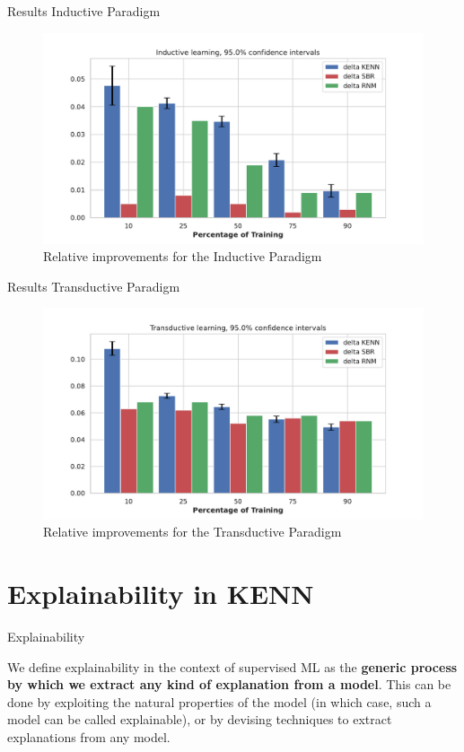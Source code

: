 \documentclass{beamer}
\begin{document}
\begin{frame}{Results Inductive Paradigm}
	\begin{figure}
		\centering
		\includegraphics[width=\linewidth]{images/deltas_inductive.pdf}
		\caption{Relative improvements for the Inductive Paradigm}
	\end{figure}
\end{frame}

\begin{frame}{Results Transductive Paradigm}
	\begin{figure}
		\centering
		\includegraphics[width=\linewidth]{images/deltas_transductive.pdf}
		\caption{Relative improvements for the Transductive Paradigm}
	\end{figure}
\end{frame}

\section{Explainability in KENN}

\begin{frame}{Explainability}
	\begin{definition}[Explainability]
		We define explainability in the context of supervised ML
		as the \textbf{generic process by which we extract any kind of explanation from a model}. This can
		be done by exploiting the natural properties of the model (in which case, such a model can be
		called explainable), or by devising techniques to extract explanations from any model.
	\end{definition}

\end{frame}
\end{document}
